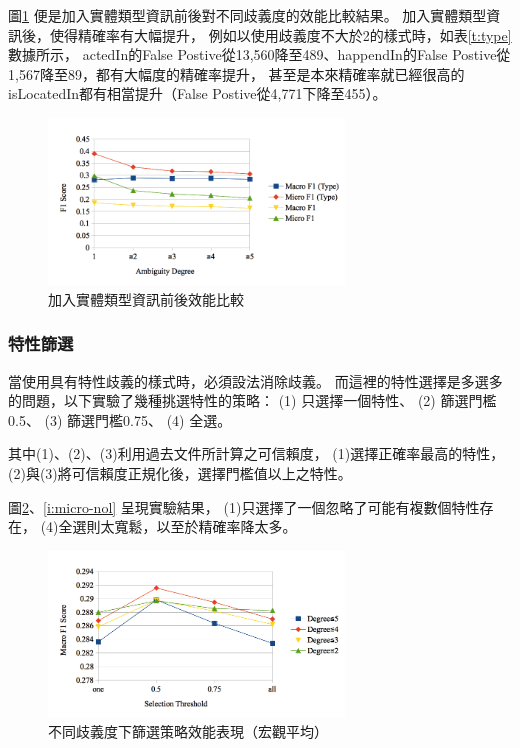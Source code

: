 圖\ref{i:type} 便是加入實體類型資訊前後對不同歧義度的效能比較結果。
加入實體類型資訊後，使得精確率有大幅提升，
例如以使用歧義度不大於2的樣式時，如表\ref{t:type} 數據所示，
actedIn的False Postive從13,560降至489、happendIn的False Postive從1,567降至89，都有大幅度的精確率提升，
甚至是本來精確率就已經很高的isLocatedIn都有相當提升（False Postive從4,771下降至455）。

\begin{figure}[h]
    \centering
    \includegraphics[width=0.7\textwidth]{images/04-type}
    \caption{加入實體類型資訊前後效能比較}
    \label{i:type}
\end{figure}



\subsubsection{特性篩選}
當使用具有特性歧義的樣式時，必須設法消除歧義。
而這裡的特性選擇是多選多的問題，以下實驗了幾種挑選特性的策略：
(1) 只選擇一個特性、 (2) 篩選門檻0.5、 (3) 篩選門檻0.75、 (4) 全選。

其中(1)、(2)、(3)利用過去文件所計算之可信賴度，
(1)選擇正確率最高的特性，
(2)與(3)將可信賴度正規化後，選擇門檻值以上之特性。

圖\ref{i:macro-nol}、\ref{i:micro-nol} 呈現實驗結果，
(1)只選擇了一個忽略了可能有複數個特性存在，
(4)全選則太寬鬆，以至於精確率降太多。

\begin{figure}[h]
    \centering
    \includegraphics[width=0.7\textwidth]{images/04-macro-nol}
    \caption{不同歧義度下篩選策略效能表現（宏觀平均）}
    \label{i:macro-nol}
\end{figure}

